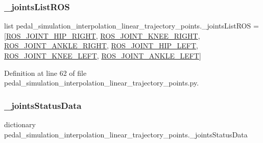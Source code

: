 \subsubsection{\texorpdfstring{\_jointsListROS}{\_jointsListROS}}
{\footnotesize\ttfamily list pedal\+\_\+simulation\+\_\+interpolation\+\_\+linear\+\_\+trajectory\+\_\+points.\+\_\+joints\+List\+R\+OS = \mbox{[}\mbox{\hyperlink{namespacepedal__simulation__interpolation__linear__trajectory__points_a073eb93be3570097fd140f4488393467}{R\+O\+S\+\_\+\+J\+O\+I\+N\+T\+\_\+\+H\+I\+P\+\_\+\+R\+I\+G\+HT}}, \mbox{\hyperlink{namespacepedal__simulation__interpolation__linear__trajectory__points_af1c84f3b73df0161dd11c10d2faa4112}{R\+O\+S\+\_\+\+J\+O\+I\+N\+T\+\_\+\+K\+N\+E\+E\+\_\+\+R\+I\+G\+HT}}, \mbox{\hyperlink{namespacepedal__simulation__interpolation__linear__trajectory__points_a593c7b6f49b5c4ba041aa3efe609fb75}{R\+O\+S\+\_\+\+J\+O\+I\+N\+T\+\_\+\+A\+N\+K\+L\+E\+\_\+\+R\+I\+G\+HT}}, \mbox{\hyperlink{namespacepedal__simulation__interpolation__linear__trajectory__points_a4134acdea8d46c49c3031087a5dfa459}{R\+O\+S\+\_\+\+J\+O\+I\+N\+T\+\_\+\+H\+I\+P\+\_\+\+L\+E\+FT}}, \mbox{\hyperlink{namespacepedal__simulation__interpolation__linear__trajectory__points_a0e2787b945854e034b47dec8918298f2}{R\+O\+S\+\_\+\+J\+O\+I\+N\+T\+\_\+\+K\+N\+E\+E\+\_\+\+L\+E\+FT}}, \mbox{\hyperlink{namespacepedal__simulation__interpolation__linear__trajectory__points_a601687afe04f4c7814fee7ac4af804f6}{R\+O\+S\+\_\+\+J\+O\+I\+N\+T\+\_\+\+A\+N\+K\+L\+E\+\_\+\+L\+E\+FT}}\mbox{]}\hspace{0.3cm}{\ttfamily [private]}}



Definition at line 62 of file pedal\+\_\+simulation\+\_\+interpolation\+\_\+linear\+\_\+trajectory\+\_\+points.\+py.

\mbox{\label{namespacepedal__simulation__interpolation__linear__trajectory__points_a12bf389baf4d2446ef9913c03d1f8d9f}} 
\subsubsection{\texorpdfstring{\_jointsStatusData}{\_jointsStatusData}}
{\footnotesize\ttfamily dictionary pedal\+\_\+simulation\+\_\+interpolation\+\_\+linear\+\_\+trajectory\+\_\+points.\+\_\+joints\+Status\+Data\hspace{0.3cm}{\ttfamily [private]}}

